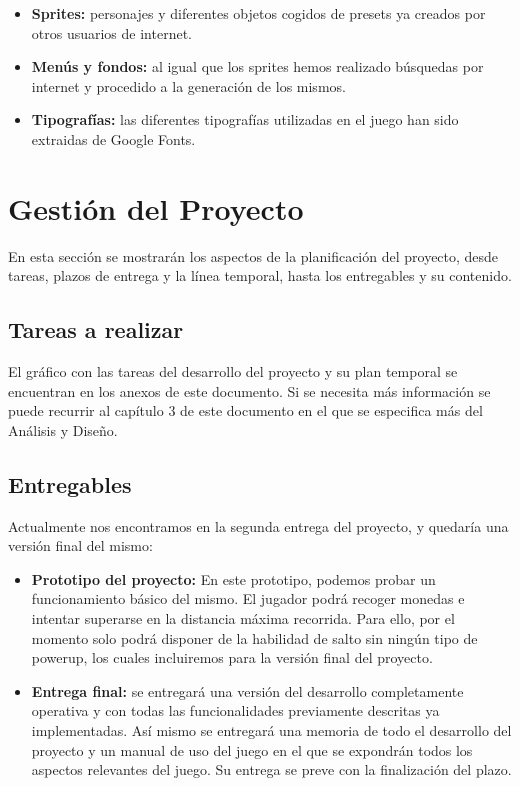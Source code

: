 \documentclass[palatino]{apuntes}
\begin{document}
\begin{itemize}
	\item \textbf{Sprites:} personajes y diferentes objetos  cogidos de presets ya creados por otros usuarios de internet.
	\item \textbf{Menús y fondos:} al igual que los sprites hemos realizado búsquedas por internet y procedido a la generación de los mismos.
	
	\item \textbf{Tipografías:} las diferentes tipografías utilizadas en el juego han sido extraidas de Google Fonts.
\end{itemize}




\chapter{Gestión del Proyecto}
En esta sección se mostrarán los aspectos de la planificación del proyecto, desde tareas, plazos de entrega y la línea temporal, hasta los entregables y su contenido.

\section{Tareas a realizar}
El gráfico con las tareas del desarrollo del proyecto y su plan temporal se encuentran en los anexos de este documento. Si se necesita más información se puede recurrir al capítulo 3 de este documento en el que se especifica más del Análisis y Diseño.

\section{Entregables}

Actualmente nos encontramos en la segunda entrega del proyecto, y quedaría una versión final del mismo:

\begin{itemize}

	\item \textbf{Prototipo del proyecto:} En este prototipo, podemos probar un funcionamiento básico del mismo. El jugador podrá recoger monedas e intentar superarse en la distancia máxima recorrida. Para ello, por el momento solo podrá disponer de la habilidad de salto sin ningún tipo de powerup, los cuales incluiremos para la versión final del proyecto.

	\item \textbf{Entrega final:} se entregará una versión del desarrollo completamente operativa y con todas las funcionalidades previamente descritas ya implementadas. Así mismo se entregará una memoria de todo el desarrollo del proyecto y un manual de uso del juego en el que se expondrán todos los aspectos relevantes del juego. Su entrega se preve con la finalización del plazo.
\end{itemize}
\end{document}
